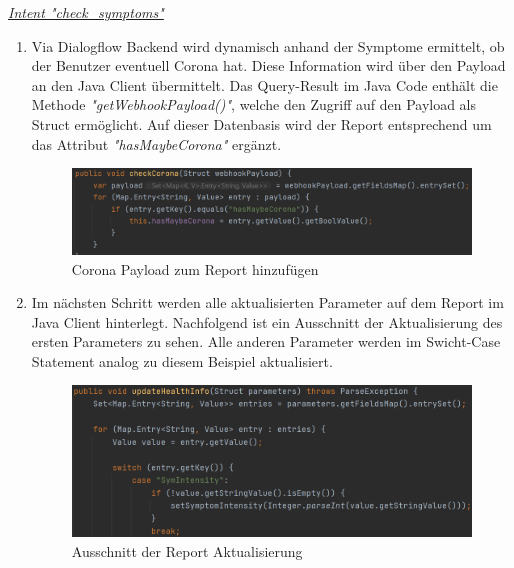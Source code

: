 \documentclass[11pt,a4paper]{article}
\begin{document}
		\underline{\emph{Intent "check\_symptoms"}} \\
		\begin{enumerate}
			\item Via Dialogflow Backend wird dynamisch anhand der Symptome ermittelt, ob der Benutzer eventuell Corona hat. Diese Information wird über den Payload an den Java Client übermittelt. Das Query-Result im Java Code enthält die Methode \emph{"getWebhookPayload()"}, welche den Zugriff auf den Payload als Struct ermöglicht. Auf dieser Datenbasis wird der Report entsprechend um das Attribut \emph{"hasMaybeCorona"} ergänzt.
			\begin{figure}[h!]
				\begin{center}
            		\includegraphics[width=0.8\linewidth]{JavaClient-CoronaCheck.png}
					\caption{Corona Payload zum Report hinzufügen}
					\label{fig:javaClient_coronaCheck}
				\end{center}
			\end{figure}
			
			\item Im nächsten Schritt werden alle aktualisierten Parameter auf dem Report im Java Client hinterlegt. Nachfolgend ist ein Ausschnitt der Aktualisierung des ersten Parameters zu sehen. Alle anderen Parameter werden im Swicht-Case Statement analog zu diesem Beispiel aktualisiert.
			\begin{figure}[h!]
				\begin{center}
            		\includegraphics[width=0.8\linewidth]{JavaClient-ParameterHandling.png}
					\caption{Ausschnitt der Report Aktualisierung}
					\label{fig:javaClient_parameterHandling}
				\end{center}
			\end{figure}
		\end{enumerate}
		
\end{document}
